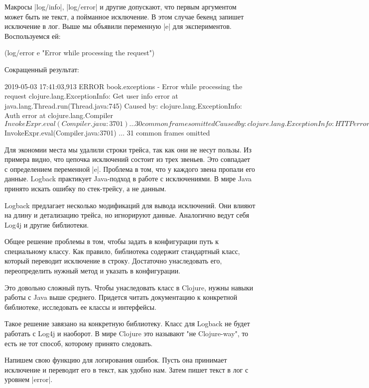 Макросы \spverb|log/info|, \spverb|log/error| и другие допускают, что первым аргументом может
быть не текст, а пойманное исключение. В этом случае бекенд запишет исключение в
лог. Выше мы объявили переменную \spverb|e| для экспериментов. Воспользуемся ей:

\begin{code}
(log/error e "Error while processing the request")
\end{code}

Сокращенный результат:

\begin{code}
2019-05-03 17:41:03,913 ERROR book.exceptions - Error while processing the request
clojure.lang.ExceptionInfo: Get user info error
	at java.lang.Thread.run(Thread.java:745)
Caused by: clojure.lang.ExceptionInfo: Auth error
	at clojure.lang.Compiler$InvokeExpr.eval(Compiler.java:3701)
	... 30 common frames omitted
Caused by: clojure.lang.ExceptionInfo: HTTP error
	at clojure.lang.Compiler$InvokeExpr.eval(Compiler.java:3701)
	... 31 common frames omitted
\end{code}

Для экономии места мы удалили строки трейса, так как они не несут пользы. Из
примера видно, что цепочка исключений состоит из трех звеньев. Это совпадает с
определением переменной \spverb|e|. Проблема в том, что у каждого звена пропали его
данные. Logback практикует Java-подход в работе с исключениями. В мире Java
принято искать ошибку по стек-трейсу, а не данным.

Logback предлагает несколько модификаций для вывода исключений. Они влияют на
длину и детализацию трейса, но игнорируют данные. Аналогично ведут себя Log4j и
другие библиотеки.

Общее решение проблемы в том, чтобы задать в конфигурации путь к специальному
классу. Как правило, библиотека содержит стандартный класс, который переводит
исключение в строку. Достаточно унаследовать его, переопределить нужный метод и
указать в конфигурации.

Это довольно сложный путь. Чтобы унаследовать класс в Clojure, нужны навыки
работы с Java выше среднего. Придется читать документацию к конкретной
библиотеке, исследовать ее классы и интерфейсы.

Такое решение завязано на конкретную библиотеку. Класс для Logback не будет
работать с Log4j и наоборот. В мире Clojure это называют "не Clojure-way", то
есть не тот способ, которому принято следовать.

Напишем свою функцию для логирования ошибок. Пусть она принимает исключение и
переводит его в текст, как удобно нам. Затем пишет текст в лог с уровнем
\spverb|error|.

